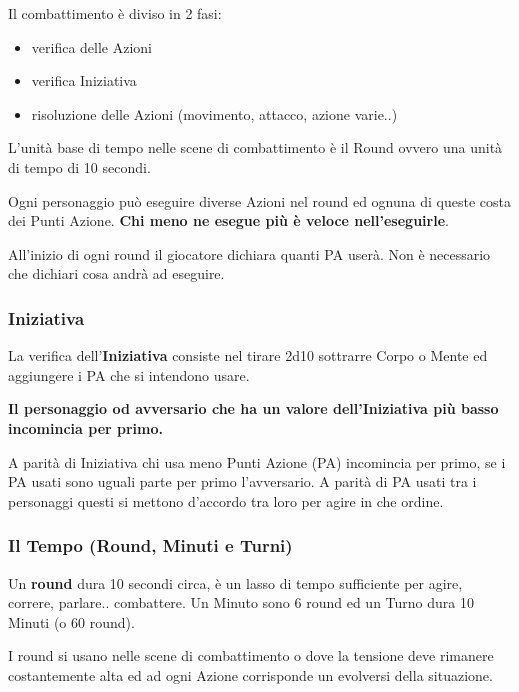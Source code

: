 \documentclass[12pt,a4paper,twoside,openany]{book}
\begin{document}
\begin{multicols}{2}
	
Il combattimento è diviso in 2 fasi:
\begin{itemize}
	\item verifica delle Azioni
	\item verifica Iniziativa
	\item risoluzione delle Azioni (movimento, attacco, azione varie..)
\end{itemize}

L'unità base di tempo nelle scene di combattimento è il Round ovvero una unità di tempo di 10 secondi.

Ogni personaggio può eseguire diverse Azioni nel round ed ognuna di queste costa dei Punti Azione. \textbf{Chi meno ne esegue più è veloce nell'eseguirle}.

All'inizio di ogni round il giocatore dichiara quanti PA userà. Non è necessario che dichiari cosa andrà ad eseguire.

\subsubsection{Iniziativa}

La verifica dell'\textbf{Iniziativa} consiste nel tirare 2d10 sottrarre Corpo o Mente ed aggiungere i PA che si intendono usare.

\textbf{Il personaggio od avversario che ha un valore dell'Iniziativa più basso incomincia per primo.}

A parità di Iniziativa chi usa meno Punti Azione (PA) incomincia per primo, se i PA usati sono uguali parte per primo l'avversario.
A parità di PA usati tra i personaggi questi si mettono d'accordo tra loro per agire in che ordine.

\subsubsection{Il Tempo (Round, Minuti e Turni)}\label{iltempo}

Un \textbf{round} dura 10 secondi circa, è un lasso di tempo sufficiente per agire, correre, parlare.. combattere. Un Minuto sono 6 round ed un Turno dura 10 Minuti (o 60 round).

I round si usano nelle scene di combattimento o dove la tensione deve rimanere costantemente alta ed ad ogni Azione corrisponde un evolversi della situazione.


\end{multicols}
\end{document}
